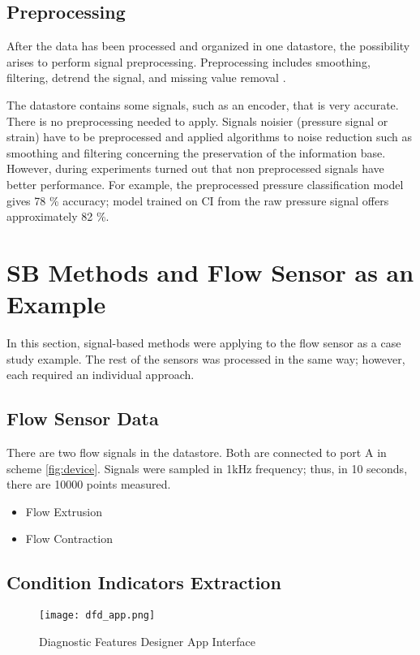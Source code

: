 \subsection{Preprocessing}

After the data has been processed and organized in one datastore, the
possibility arises to perform signal preprocessing.  Preprocessing includes
smoothing, filtering, detrend the signal, and missing value removal
\cite{matlab_full}.

The datastore contains some signals, such as an encoder, that is very
accurate. There is no preprocessing needed to apply. Signals noisier
(pressure signal or strain) have to be preprocessed and applied algorithms
to noise reduction such as smoothing and filtering concerning the
preservation of the information base. However, during experiments turned
out that non preprocessed signals have better performance. For example, the
preprocessed pressure classification model gives 78 \% accuracy; model
trained on CI from the raw pressure signal offers approximately 82 \%.

\section{SB Methods and Flow Sensor as an Example}\label{sec:flow_example}
In this section, signal-based methods were applying to the flow sensor as a
case study example.  The rest of the sensors was processed in the same way;
however, each required an individual approach.

\subsection{Flow Sensor Data}
There are two flow signals in the datastore. Both are connected to port A
in scheme \ref{fig:device}. Signals were sampled in 1kHz frequency; thus, in 10
seconds, there are 10000 points measured. 

\begin{itemize}
    \item Flow Extrusion
    \item Flow Contraction
\end{itemize}

\subsection{Condition Indicators Extraction}

\begin{figure}[h!]
    \centering
    \texttt{[image: dfd\_app.png]}
    \caption{Diagnostic Features Designer App Interface}
    \label{fig:dfd_app}
\end{figure}

